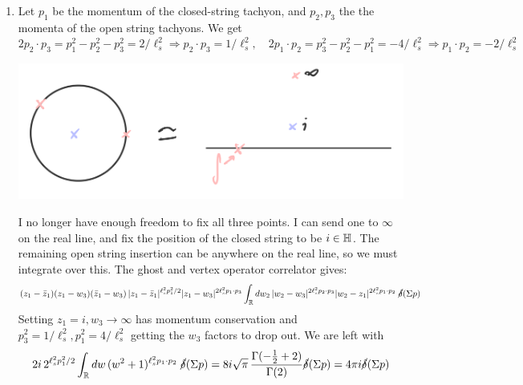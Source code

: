 \documentclass[11pt, class=article, crop=false]{standalone}
\begin{document}
\begin{enumerate}
	\item Let $p_1$ be the momentum of the closed-string tachyon, and $p_2, p_3$ the the momenta of the open string tachyons. We get $2 p_2 \cdot p_3 = p_1^2 - p_2^2 - p_3^2 = 2/\ell_s^2 \Rightarrow p_2 \cdot p_3 = 1/\ell_s^2, \quad 2 p_1 \cdot p_2 = p_3^2 - p_2^2 - p_1^2  = -4/\ell_s^2 \Rightarrow p_1 \cdot p_2 = -2/\ell_s^2$
	
	\begin{center}
		\includegraphics[scale=0.1]{"Drawings/59"}
	\end{center}
	
	 I no longer have enough freedom to fix all three points. I can send one to $\infty$ on the real line, and fix the position of the closed string to be $i \in \mathbb{H}$. The remaining open string insertion can be anywhere on the real line, so we must integrate over this. The ghost and vertex operator correlator gives:
	\[
		(z_1 - \bar z_1) (z_1 - w_3) (\bar z_1 - w_3)\,  |z_1 - \bar z_1|^{\ell_s^2 p_1^2/2} |z_1 - w_3|^{2 \ell_s^2 p_1 \cdot p_3} \int_{\mathbb{R}} dw_2 \, |w_2 - w_3|^{2 \ell_s^2 p_2 \cdot p_3} |w_2 - z_1|^{2 \ell_s^2 p_1 \cdot p_2} \; \cancel\delta(\Sigma p)
	\] 
	Setting $z_1 = i, w_3 \to \infty$ has momentum conservation and $p_3^2 = 1/\ell_s^2, p_1^2 = 4/\ell_s^2$ getting the $w_3$ factors to drop out. We are left with
	\[
		2i \,2^{\ell_s^2 p_1^2/2} \int_{\mathbb{R}} dw \, (w^2 + 1)^{\ell_s^2 p_1 \cdot p_2} \; \cancel\delta(\Sigma p) = 8 i \sqrt\pi \,  \frac{ \Gamma(-\frac12 +2)}{\Gamma(2)} \cancel\delta(\Sigma p) = 4\pi i \cancel\delta(\Sigma p)
	\]


\end{enumerate}
\end{document}

